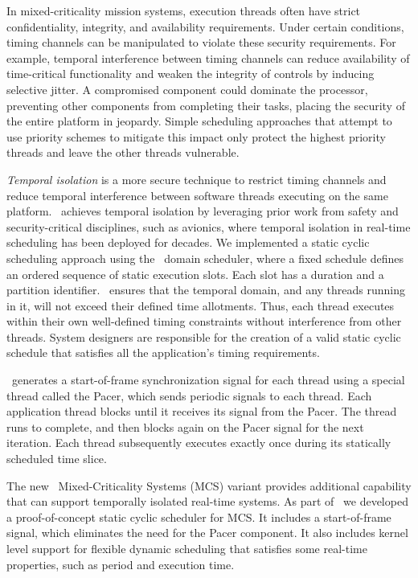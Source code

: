
In mixed-criticality mission systems,
execution threads often 
have strict confidentiality, integrity, and availability requirements. 
Under certain conditions,
timing channels can be manipulated to violate these security requirements. 
For example, temporal interference between timing channels
can reduce availability of time-critical functionality 
and weaken the integrity of controls by inducing selective jitter.
A compromised component could dominate the processor, 
preventing other components from completing their tasks, placing the security 
of the entire platform in jeopardy. 
Simple scheduling approaches that attempt to use priority schemes to mitigate 
this impact only protect the highest priority threads and leave the other
threads vulnerable.

\emph{Temporal isolation} is a more secure technique to restrict timing channels and
reduce temporal interference between software threads executing on the same platform. 
\briefcase\ achieves temporal isolation by leveraging
prior work from safety and security-critical disciplines, such as
avionics, where temporal isolation in real-time scheduling has been
deployed for decades.
We implemented a static cyclic scheduling
approach using the \selFour\ domain scheduler, where a fixed schedule
defines an ordered sequence of static execution slots. Each slot has a
duration and a partition identifier.  \selFour\ ensures that the
temporal domain, and any threads running in it, will not exceed their defined
time allotments. Thus, each thread executes within their own
well-defined timing constraints without interference from other threads.
System designers are responsible for the
creation of a valid static cyclic schedule that
satisfies all the application's timing requirements.

\briefcase\ generates a start-of-frame synchronization signal for each thread using
a special thread called the Pacer, which sends periodic signals
to each thread. Each application thread blocks until it receives its
signal from the Pacer. The thread runs to complete, and then
blocks again on the Pacer signal for the next iteration. 
Each thread subsequently executes
exactly once during its statically scheduled time slice.

The new \selFour\ Mixed-Criticality Systems (MCS) variant provides
additional capability that can support temporally isolated
real-time systems. 
As part of \briefcase\ we developed a proof-of-concept static cyclic
scheduler for MCS.
It includes a start-of-frame signal, which
eliminates the need for the Pacer component. It also includes kernel
level support for flexible dynamic scheduling that satisfies some
real-time properties, such as period and execution time.

